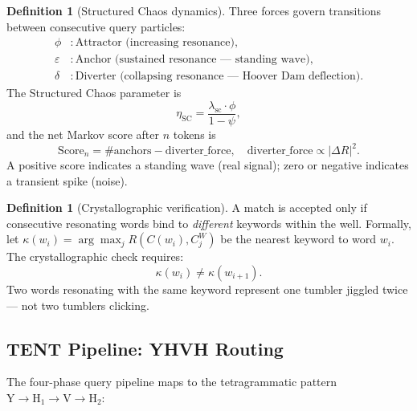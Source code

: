 \documentclass[12pt,a4paper]{article}
\theoremstyle{plain}
\theoremstyle{definition}
\newtheorem{definition}[theorem]{Definition}
\theoremstyle{remark}
\begin{document}
\begin{definition}[Structured Chaos dynamics]
Three forces govern transitions between consecutive query particles:
\begin{align}
\phi &: \text{Attractor (increasing resonance)}, \\
\varepsilon &: \text{Anchor (sustained resonance --- standing wave)}, \\
\delta &: \text{Diverter (collapsing resonance --- Hoover Dam deflection)}.
\end{align}
The Structured Chaos parameter is
\begin{equation}
\eta_{\text{SC}} = \frac{\lambda_{\text{sc}} \cdot \phi}{1 - \psi},
\end{equation}
and the net Markov score after $n$ tokens is
\begin{equation}
\text{Score}_n = \#\text{anchors} - \text{diverter\_force},
\quad
\text{diverter\_force} \propto |\Delta R|^2.
\end{equation}
A positive score indicates a standing wave (real signal);
zero or negative indicates a transient spike (noise).
\end{definition}

\begin{definition}[Crystallographic verification]
\label{def:crystal}
A match is accepted only if consecutive resonating words bind to
\emph{different} keywords within the well.  Formally, let
$\kappa(w_i) = \arg\max_j R(C(w_i), C_j^W)$ be the nearest keyword
to word $w_i$.  The crystallographic check requires:
\begin{equation}
\kappa(w_i) \neq \kappa(w_{i+1}).
\end{equation}
Two words resonating with the same keyword represent one tumbler
jiggled twice --- not two tumblers clicking.
\end{definition}

\subsection{TENT Pipeline: YHVH Routing}

The four-phase query pipeline maps to the tetragrammatic pattern $\text{Y}\to\text{H}_1\to\text{V}\to\text{H}_2$:
\end{document}
